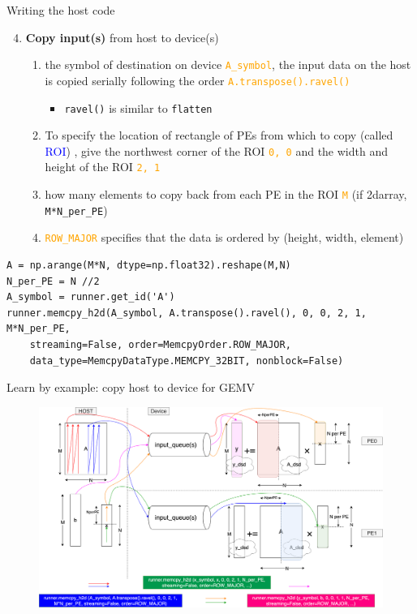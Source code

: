 \documentclass[dvipdfmx, 11pt, aspectratio=169]{beamer}   %
\begin{document}
\begin{frame}[fragile]{Writing the host code}
\begin{enumerate}\setcounter{enumi}{3}
    \item \textbf{Copy input(s)} from host to device(s)
    \begin{enumerate}
        \item the symbol of destination on device \textcolor{orange}{\lstinline|A_symbol|}, the input data on the host is copied serially following the order \textcolor{orange}{\lstinline|A.transpose().ravel()|}
        \begin{itemize}
            \item \lstinline|ravel()| is similar to \lstinline|flatten|
        \end{itemize}
        \item To specify the location of rectangle of PEs from which to copy (called \textcolor{blue}{ROI})%
        , give the northwest corner of the ROI \textcolor{orange}{\lstinline|0, 0|} and the width and height of the ROI \textcolor{orange}{\lstinline|2, 1|}
        \item how many elements to copy back from each PE in the ROI \textcolor{orange}{\lstinline|M|} (if 2darray, \lstinline|M*N_per_PE|)
        \item \textcolor{orange}{\lstinline|ROW_MAJOR|} specifies that the data is ordered by (height, width, element)
    \end{enumerate}
\end{enumerate}
\begin{lstlisting}[language=CSL]
A = np.arange(M*N, dtype=np.float32).reshape(M,N)
N_per_PE = N //2
A_symbol = runner.get_id('A')
runner.memcpy_h2d(A_symbol, A.transpose().ravel(), 0, 0, 2, 1, M*N_per_PE, 
    streaming=False, order=MemcpyOrder.ROW_MAJOR, 
    data_type=MemcpyDataType.MEMCPY_32BIT, nonblock=False)
\end{lstlisting}
\end{frame}
\begin{frame}{Learn by example: copy host to device for GEMV}
\vspace{-0.5\baselineskip}
\begin{figure}
    \includegraphics[scale=0.07]{img/csCopyh2d.png}
\end{figure}
\end{frame}
\end{document}
